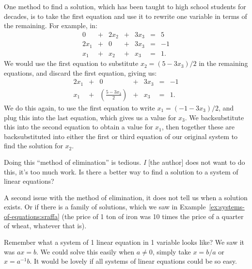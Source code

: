 One method to find a solution, which has been taught to high school
students for decades, is to take the first equation and use it to
rewrite one variable in terms of the remaining. For example, in:
\begin{equation}
  \begin{array}{rcrcrcl}
    0      & + & 2x_{2} & + & 3x_{3} & = & 5\\
    2x_{1} & + & 0      & + & 3x_{3} &=& -1\\
    x_{1}  & + & x_{2}  & + & x_{3} &=& 1.
  \end{array}
\end{equation}
We would use the first equation to substitute $x_{2}=(5 - 3x_{3})/2$ in
the remaining equations, and discard the first equation, giving us:
\begin{equation}
  \begin{array}{rcrcrcl}
    2x_{1} & + & 0      & + & 3x_{3} &=& -1\\
    x_{1}  & + & \displaystyle\left(\frac{5 - 3x_{3}}{2}\right)  & + & x_{3} &=& 1.
  \end{array}
\end{equation}
We do this again, to use the first equation to write $x_{1} = (-1-3x_{3})/2$,
and plug this into the last equation, which gives us a value for
$x_{3}$.
We backsubstitute this into the second equation to obtain a value for
$x_{1}$, then together these are backsubstituted into either the first
or third equation of our original system to find the solution for
$x_{2}$.

Doing this ``method of elimination'' is tedious. \emph{I} [the author]
does not want to do this, it's too much work. Is there a better way to
find a solution to a system of linear equations?

A second issue with the method of elimination, it does not tell us when
a solution exists. Or if there is a family of solutions, which we saw in
Example~\ref{ex:systems-of-equations:sraffa} (the price of 1 ton of iron
was 10 times the price of a quarter of wheat, whatever that is).

Remember what a system of 1 linear equation in 1 variable looks like? We
saw it was $ax=b$. We could solve this easily when $a\neq0$, simply take
$x=b/a$ or $x = a^{-1}b$. It would be lovely if all systems of linear
equations could be so easy.

